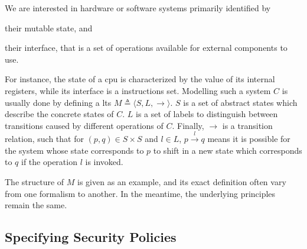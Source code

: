 We are interested in hardware or software systems primarily identified by
%
\begin{inparaenum}[(1)]
\item their mutable state, and
%
\item their interface, that is a set of operations available for external
  components to use.
\end{inparaenum}
%
For instance, the state of a \ac{cpu} is characterized by the value of its
internal registers, while its interface is a instructions set.
%
Modelling such a system $C$  is usually done by defining a
\ac{lts} $M \triangleq \langle S, L, \rightarrow \rangle$.
%
$S$ is a set of abstract states which describe the concrete states of
$C$. 
%
$L$ is a set of labels to distinguish between transitions caused by different
operations of $C$.
%
Finally, $\rightarrow$ is a transition relation, such that for
$(p, q) \in S \times S$ and $l \in L$,
%
$ p \xrightarrow{l} q $
%
means it is possible for the system whose state corresponds to $p$ to shift in a
new state which corresponds to $q$ if the operation $l$ is invoked.

The structure of $M$ is given as an example, and its exact definition often vary
from one formalism to another.
%
In the meantime, the underlying principles remain the same.


\subsection{Specifying Security Policies}
\label{subsec:state:secu}

